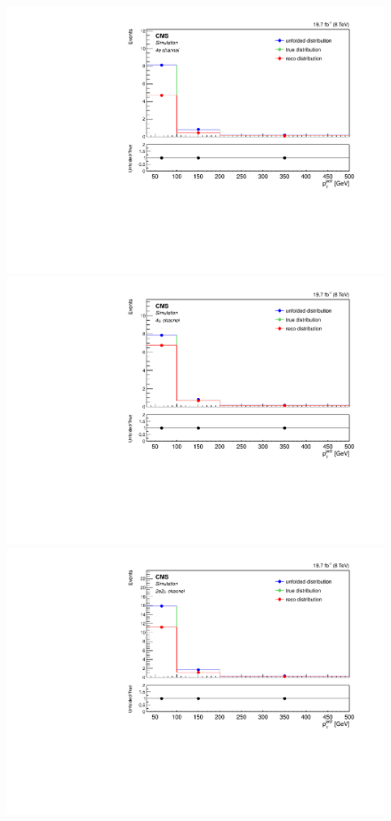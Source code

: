 \begin{figure}[hbtp]
  \begin{center}
    \includegraphics[width=0.8\cmsFigWidth]{Figures/Unfolding/MCTests/PtJet2_ZZTo4e_MadMatrix_MadDistr_FullSample_fr}     
    \includegraphics[width=0.8\cmsFigWidth]{Figures/Unfolding/MCTests/PtJet2_ZZTo4m_MadMatrix_MadDistr_FullSample_fr}     
    \includegraphics[width=0.8\cmsFigWidth]{Figures/Unfolding/MCTests/PtJet2_ZZTo2e2m_MadMatrix_MadDistr_FullSample_fr}

\end{center}
\end{figure}
